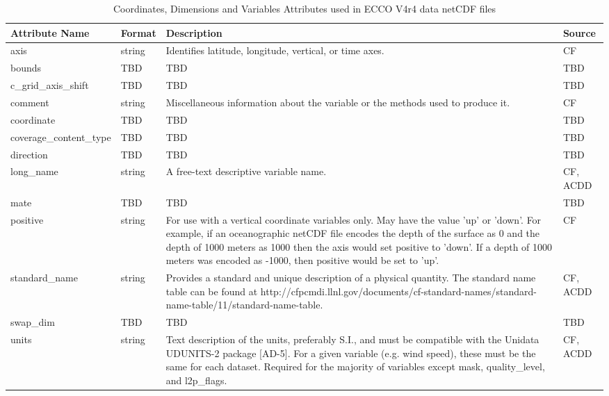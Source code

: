 \begin{longtable}{|p{}|p{}|p{}|p{}|}
\caption{Coordinates, Dimensions and Variables Attributes used in ECCO V4r4 data netCDF files}
\label{tab:variable-attributes} \\ 
\hline \endhead
\hline \endfoot
\rowcolor{blue!25} \textbf{Attribute Name} & \textbf{Format} & \textbf{Description} & \textbf{Source} \\ \hline
\rowcolor{violet!25}
axis & string & Identifies latitude, longitude, vertical, or time axes. & CF \\ \hline
\rowcolor{violet!25}
bounds & TBD & TBD & TBD \\ \hline
\rowcolor{violet!25}
c\_grid\_axis\_shift & TBD & TBD & TBD \\ \hline
\rowcolor{violet!25}
comment & string & Miscellaneous information about the variable or the methods used to produce it. & CF \\ \hline
\rowcolor{violet!25}
coordinate & TBD & TBD & TBD \\ \hline
\rowcolor{violet!25}
coverage\_content\_type & TBD & TBD & TBD \\ \hline
\rowcolor{violet!25}
direction & TBD & TBD & TBD \\ \hline
\rowcolor{violet!25}
long\_name & string & A free-text descriptive variable name. & CF, ACDD \\ \hline
\rowcolor{violet!25}
mate & TBD & TBD & TBD \\ \hline
\rowcolor{violet!25}
positive & string & For use with a vertical coordinate variables only. May have the value 'up' or 'down'. For example, if an oceanographic netCDF file encodes the depth of the surface as 0 and the depth of 1000 meters as 1000 then the axis would set positive to 'down'. If a depth of 1000 meters was encoded as -1000, then positive would be set to 'up'. & CF \\ \hline
\rowcolor{violet!25}
standard\_name & string & Provides a standard and unique description of a physical quantity. The standard name table can be found at http://cfpcmdi.llnl.gov/documents/cf-standard-names/standard-name-table/11/standard-name-table. & CF, ACDD \\ \hline
\rowcolor{violet!25}
swap\_dim & TBD & TBD & TBD \\ \hline
\rowcolor{violet!25}
units & string & Text description of the units, preferably S.I., and must be compatible with the Unidata UDUNITS-2 package [AD-5]. For a given variable (e.g. wind speed), these must be the same for each dataset. Required for the majority of variables except mask, quality\_level, and l2p\_flags. & CF, ACDD \\ \hline

\end{longtable}
